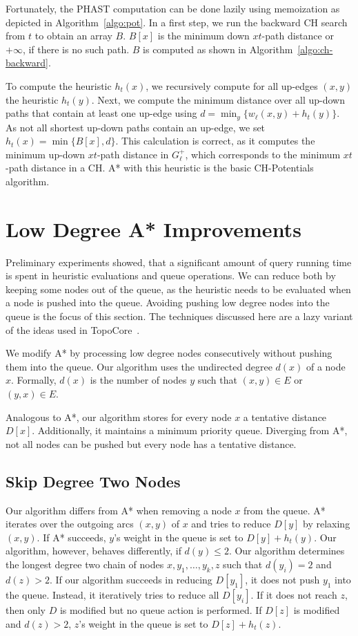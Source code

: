 \documentclass[a4paper,UKenglish,cleveref, autoref, thm-restate]{lipics-v2021}
\begin{document}
Fortunately, the PHAST computation can be done lazily using memoization as depicted in Algorithm~\ref{algo:pot}.
In a first step, we run the backward CH search from $t$ to obtain an array $B$.
$B[x]$ is the minimum down $xt$-path distance or $+\infty$, if there is no such path.
$B$ is computed as shown in Algorithm~\ref{algo:ch-backward}.

To compute the heuristic $h_t(x)$, we recursively compute for all up-edges $(x,y)$ the heuristic $h_t(y)$.
Next, we compute the minimum distance over all up-down paths that contain at least one up-edge using $d = \min_y\{w_\ell(x,y) + h_t(y)\}$.
As not all shortest up-down paths contain an up-edge, we set $h_t(x) = \min \{ B[x], d \}$.
This calculation is correct, as it computes the minimum up-down $xt$-path distance in $G^+_\ell$, which corresponds to the minimum $xt$-path distance in a CH.
A* with this heuristic is the basic CH-Potentials algorithm.

\section{Low Degree A* Improvements}

\label{sec:low-deg-improvment}

Preliminary experiments showed, that a significant amount of query running time is spent in heuristic evaluations and queue operations.
We can reduce both by keeping some nodes out of the queue, as the heuristic needs to be evaluated when a node is pushed into the queue.
Avoiding pushing low degree nodes into the queue is the focus of this section.
The techniques discussed here are a lazy variant of the ideas used in TopoCore~\cite{DBLP:conf/gis/DibbeltSW15}.

We modify A* by processing low degree nodes consecutively without pushing them into the queue.
Our algorithm uses the undirected degree $d(x)$ of a node $x$.
Formally, $d(x)$ is the number of nodes $y$ such that $(x,y)\in E$ or $(y,x)\in E$.

Analogous to A*, our algorithm stores for every node $x$ a tentative distance $D[x]$.
Additionally, it maintains a minimum priority queue.
Diverging from A*, not all nodes can be pushed but every node has a tentative distance.

\subsection{Skip Degree Two Nodes}

Our algorithm differs from A* when removing a node $x$ from the queue.
A* iterates over the outgoing arcs $(x,y)$ of $x$ and tries to reduce $D[y]$ by relaxing $(x,y)$.
If A* succeeds, $y$'s weight in the queue is set to $D[y]+h_t(y)$.
Our algorithm, however, behaves differently, if $d(y)\le 2$.
Our algorithm determines the longest degree two chain of nodes $x,y_1,\ldots, y_k, z$ such that $d(y_i)=2$ and $d(z) > 2$.
If our algorithm succeeds in reducing $D[y_1]$, it does not push $y_1$ into the queue.
Instead, it iteratively tries to reduce all $D[y_i]$.
If it does not reach $z$, then only $D$ is modified but no queue action is performed.
If $D[z]$ is modified and $d(z)>2$, $z$'s weight in the queue is set to $D[z]+h_t(z)$.
\end{document}
